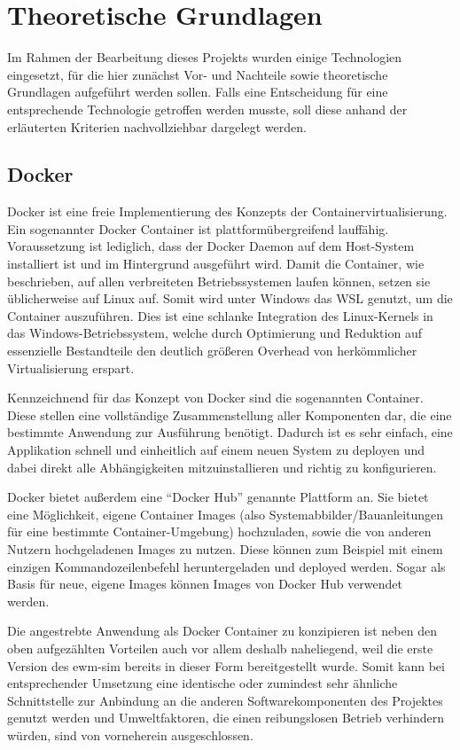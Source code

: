 \chapter{Theoretische Grundlagen}
Im Rahmen der Bearbeitung dieses Projekts wurden einige Technologien eingesetzt, für die hier zunächst Vor- und Nachteile sowie theoretische Grundlagen aufgeführt werden sollen.
Falls eine Entscheidung für eine entsprechende Technologie getroffen werden musste, soll diese anhand der erläuterten Kriterien nachvollziehbar dargelegt werden.

\section{Docker}
\label{docker}
Docker ist eine freie Implementierung des Konzepts der Containervirtualisierung.
Ein sogenannter Docker Container ist plattformübergreifend lauffähig.
Voraussetzung ist lediglich, dass der Docker Daemon auf dem Host-System installiert ist und im Hintergrund ausgeführt wird.
Damit die Container, wie beschrieben, auf allen verbreiteten Betriebssystemen laufen können, setzen sie üblicherweise auf Linux auf.
Somit wird unter Windows das \ac{WSL} genutzt, um die Container auszuführen.
Dies ist eine schlanke Integration des Linux-Kernels in das Windows-Betriebssystem, welche durch Optimierung und Reduktion auf essenzielle Bestandteile den deutlich größeren Overhead von herkömmlicher Virtualisierung erspart.~\cite{wsl}

Kennzeichnend für das Konzept von Docker sind die sogenannten Container.
Diese stellen eine vollständige Zusammenstellung aller Komponenten dar, die eine bestimmte Anwendung zur Ausführung benötigt.
Dadurch ist es sehr einfach, eine Applikation schnell und einheitlich auf einem neuen System zu deployen und dabei direkt alle Abhängigkeiten mitzuinstallieren und richtig zu konfigurieren.~\cite{whatisacontainer}

Docker bietet außerdem eine \enquote{Docker Hub} genannte Plattform an.
Sie bietet eine Möglichkeit, eigene Container Images (also Systemabbilder/Bauanleitungen für eine bestimmte Container-Umgebung) hochzuladen, sowie die von anderen Nutzern hochgeladenen Images zu nutzen.
Diese können zum Beispiel mit einem einzigen Kommandozeilenbefehl heruntergeladen und deployed werden. Sogar als Basis für neue, eigene Images können Images von Docker Hub verwendet werden.~\cite{dockerhub}

Die angestrebte Anwendung als Docker Container zu konzipieren ist neben den oben aufgezählten Vorteilen auch vor allem deshalb naheliegend, weil die erste Version des \ac{ewm-sim} bereits in dieser Form bereitgestellt wurde.
Somit kann bei entsprechender Umsetzung eine identische oder zumindest sehr ähnliche Schnittstelle zur Anbindung an die anderen Softwarekomponenten des Projektes genutzt werden und Umweltfaktoren, die einen reibungslosen Betrieb verhindern würden, sind von vorneherein ausgeschlossen.

